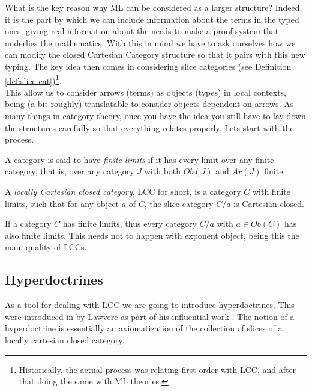 What is the key reason why ML can be considered as a larger structure? Indeed, it is the part by which we can include information about the terms in the typed ones, giving real information about the needs to make a proof system that underlies the mathematics. With this in mind we have to ask ourselves how we can modify the closed Cartesian Category structure so that it pairs with this new typing.  The key idea then comes in considering slice categories (see Definition \ref{def:slice-cat})\footnote{Historically, the actual process was relating first order with LCC, and after that doing the same with ML theories.}.\\

This allow us to consider arrows (terms) as objects (types) in local contexts, being (a bit roughly) translatable to consider objects dependent on arrows.  As many things in category theory, once you have the idea you still have to lay down the structures carefully so that everything relates properly. Lets start with the process.

\begin{definition}
  A category is said to have \emph{finite limits} if it has every limit over any finite category, that is, over any category $J$ with both $Ob(J)$ and $Ar(J)$ finite.
\end{definition}

\begin{definition}
  A \emph{locally Cartesian closed category}, LCC for short,  is a category $C$ with finite limits, such that for any object $a$ of $C$, the slice category $C/a $ is Cartesian closed.
\end{definition}

\begin{remark}
  If a category $C$ has finite limits, thus every category $C/a$ with $a\in Ob(C)$  has also finite limits. This needs not to happen with exponent object, being this the main quality of LCCs.
\end{remark}

\subsection{Hyperdoctrines}


As a tool for dealing with LCC we are going to introduce hyperdoctrines. This were introduced in by Lawvere as part of his influential work \cite{lawvere1969adjointness}. The notion of a hyperdoctrine is essentially an axiomatization of the collection of slices of a locally cartesian closed category\cite{nlab:hyperdoctrine}.

